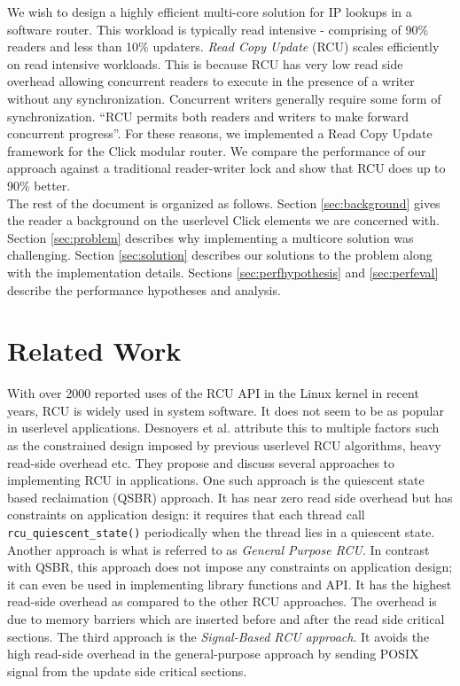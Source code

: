 \documentclass[a4paper,marginparwidth=50pt,marginparsep=10pt]{article}
\begin{document}
We wish to design a highly efficient multi-core solution for IP lookups in a software router. This workload is typically read intensive - comprising of 90\% readers and less than 10\% updaters. \emph{Read Copy Update} (RCU)\cite{readcopyupdate} scales efficiently on read intensive workloads. This is because RCU has very low read side overhead allowing concurrent readers to execute in the presence of a writer without any synchronization. Concurrent writers generally require some form of synchronization. ``RCU permits both readers and writers to make forward concurrent progress''\cite{urcu}. For these reasons, we implemented a Read Copy Update framework for the Click modular router. We compare the performance of our approach against a traditional reader-writer lock and show that RCU does up to 90\% better.\\

The rest of the document is organized as follows. Section \ref{sec:background} gives the reader a background on the userlevel Click elements we are concerned with. Section \ref{sec:problem} describes why implementing a multicore solution was challenging. Section \ref{sec:solution} describes our solutions to the problem along with the implementation details. Sections \ref{sec:perfhypothesis} and \ref{sec:perfeval} describe the performance hypotheses and analysis.
\section{Related Work}
With over 2000 reported uses of the RCU API \cite{rcuusage} in the Linux kernel in recent years, RCU is widely used in system software. It does not seem to be as popular in userlevel applications. Desnoyers et al. \cite{urcu} attribute this to multiple factors such as the constrained design imposed by previous userlevel RCU algorithms, heavy read-side overhead etc. They propose and discuss several approaches to implementing RCU in applications. One such approach is the quiescent state based reclaimation (QSBR)  approach. It has near zero read side overhead but has constraints on application design: it requires that each thread call \verb+rcu_quiescent_state()+ periodically when the thread lies in a quiescent state. Another approach is what is referred to as \emph{General Purpose RCU}. In contrast with QSBR, this approach does not impose any constraints on application design; it can even be used in implementing library functions and API. It has the highest read-side overhead as compared to the other RCU approaches. The overhead is due to memory barriers which are inserted before and after the read side critical sections. The third approach is the \emph{Signal-Based RCU approach}. It avoids the high read-side overhead in the general-purpose approach by sending POSIX signal from the update side critical sections.
\end{document}

